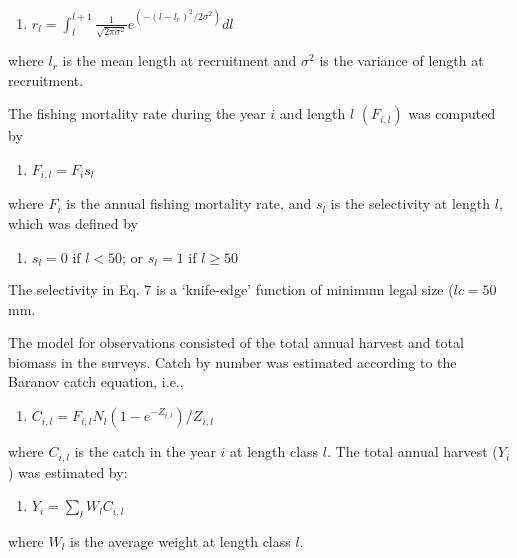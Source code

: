 \documentclass[]{article}
\providecommand{\tightlist}{%
  \setlength{\itemsep}{0pt}\setlength{\parskip}{0pt}}
\begin{document}
\begin{enumerate}
\def\labelenumi{\arabic{enumi})}
\setcounter{enumi}{4}
\tightlist
\item
  \(r_l=\int_l^{l+1}\frac{1}{\sqrt{2\pi\sigma^2}} e^{(-(l-l_r)^2/2\sigma^2)}dl\)
\end{enumerate}

where \(l_r\) is the mean length at recruitment and \(\sigma^2\) is the
variance of length at recruitment.

The fishing mortality rate during the year \(i\) and length \(l\)
\((F_{i,l})\) was computed by

\begin{enumerate}
\def\labelenumi{\arabic{enumi})}
\setcounter{enumi}{5}
\tightlist
\item
  \(F_{i,l} = F_i s_l\)
\end{enumerate}

where \(F_i\) is the annual fishing mortality rate, and \(s_l\) is the
selectivity at length \(l\), which was defined by

\begin{enumerate}
\def\labelenumi{\arabic{enumi})}
\setcounter{enumi}{6}
\tightlist
\item
  \(s_l =0 \text{   if   } l < 50 \text{;  or   } s_l = 1 \text{     if      } l \geqslant 50\)
\end{enumerate}

The selectivity in Eq. 7 is a `knife-edge' function of minimum legal
size (\(lc=50\) mm.

The model for observations consisted of the total annual harvest and
total biomass in the surveys. Catch by number was estimated according to
the Baranov catch equation, i.e.,

\begin{enumerate}
\def\labelenumi{\arabic{enumi})}
\setcounter{enumi}{7}
\tightlist
\item
  \(C_{i,l}=F_{i,l} N_l (1-e^{-Z_{i,l}})/Z_{i,l}\)
\end{enumerate}

where \(C_{i,l}\) is the catch in the year \(i\) at length class \(l\).
The total annual harvest (\(Y_i\)) was estimated by:

\begin{enumerate}
\def\labelenumi{\arabic{enumi})}
\setcounter{enumi}{8}
\tightlist
\item
  \(Y_i=\sum_l W_l C_{i,l}\)
\end{enumerate}

where \(W_l\) is the average weight at length class \(l\).
\end{document}
